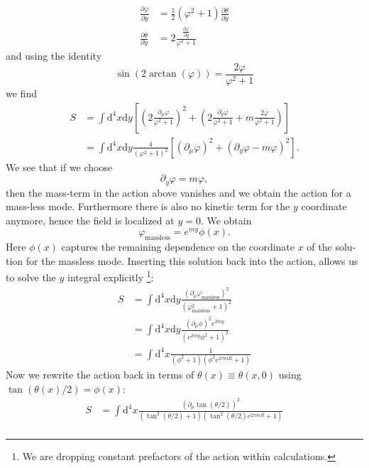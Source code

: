 \documentclass[master,       %
               twoside,        %
               BCOR10mm,       %
               english,ngerman, %
               ]{GAUBM}
\begin{document}
\begin{otherlanguage}{english}
\begin{align}
	\frac{\partial \varphi}{\partial y} &= \frac{1}{2} (\varphi^2 + 1) \frac{\partial \theta}{\partial y} \nonumber \\
	\frac{\partial \theta}{\partial y} &= 2 \frac{\frac{\partial \varphi}{\partial y}}{\varphi^2 + 1}
\end{align}
and using the identity
\begin{equation}
	\sin(2 \arctan(\varphi)) = \frac{2 \varphi}{\varphi^2 + 1}
\end{equation}
we find
\begin{align}
    S &= \int \mathrm{d}^4 x \mathrm{d} y \left[
    \left(2 \frac{\partial_\mu \varphi}{\varphi^2 + 1} \right)^2 +
    \left(2 \frac{\partial_y \varphi}{\varphi^2 + 1} + m \frac{2 \varphi}{\varphi^2 + 1} \right) \right] \nonumber \\
    &= \int \mathrm{d}^4 x \mathrm{d} y  \frac{4}{(\varphi^2 + 1)^2}
    \left[ (\partial_\mu \varphi)^2 + (\partial_y \varphi - m \varphi)^2 \right].
\end{align}
We see that if we choose
\begin{equation}
	\partial_y \varphi = m \varphi,
\end{equation}
then the mass-term in the action above vanishes and we obtain the action for a mass-less mode. Furthermore there is also no kinetic term for the $y$ coordinate anymore, hence the field is localized at $y = 0$.
We obtain
\begin{equation}
	\varphi_{\mathrm{massless}} = e^{my} \phi(x).
\end{equation}
Here $\phi(x)$ captures the remaining dependence on the coordinate $x$ of the solution for the massless mode.
Inserting this solution back into the action, allows us to solve the $y$ integral explicitly \footnote{We are dropping constant prefactors of the action within calculations.}:
\begin{align}
	S &= \int \mathrm{d}^4 x \mathrm{d} y  \frac{(\partial_\mu \varphi_{\mathrm{massless}})^2}{(\varphi_{\mathrm{massless}}^2 + 1)^2} \nonumber \\
	&= \int \mathrm{d}^4 x \mathrm{d} y  \frac{(\partial_\mu \phi)^2 e^{2my}}{(e^{2my} \phi^2 + 1)^2} \nonumber \\
	&= \int \mathrm{d}^4 x\frac{1}{(\phi^2 + 1)(\phi^2 e^{2\pi m R} + 1)}
\end{align}
Now we rewrite the action back in terms of $\theta(x) \equiv \theta(x, 0)$ using $\tan(\theta(x)/2) = \phi(x)$:
\begin{align}
	 S &= \int \mathrm{d}^4 x \frac{(\partial_\mu \tan(\theta / 2))^2}{(\tan^2(\theta / 2) + 1)(\tan^2(\theta / 2) e^{2\pi m R} + 1)} \nonumber \\

\end{align}
\end{otherlanguage}
\end{document}
